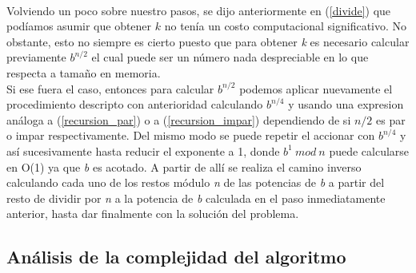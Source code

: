 {\paragraph{}
Volviendo un poco sobre nuestro pasos, se dijo anteriormente en (\ref{divide}) que podíamos asumir que obtener $k$ no tenía un costo computacional significativo. No obstante, esto no siempre es cierto puesto que para obtener \textit{k} es necesario calcular previamente $b^{n/2}$ el cual puede ser un número nada despreciable en lo que respecta a tamaño en memoria.\\
Si ese fuera el caso, entonces para calcular $b^{n/2}$ podemos aplicar nuevamente el procedimiento descripto con anterioridad calculando $b^{n/4}$ y usando una expresion análoga a (\ref{recursion_par}) o a (\ref{recursion_impar}) dependiendo de si $n/2$ es par o impar respectivamente. Del mismo modo se puede repetir el accionar con $b^{n/4}$ y así sucesivamente hasta reducir el exponente a 1, donde $b^1\ mod\ n$ puede calcularse en O(1) ya que \textit{b} es acotado. A partir de allí se realiza el camino inverso calculando cada uno de los restos módulo \textit{n} de las potencias de \textit{b} a partir del resto de dividir por \textit{n} a la potencia de \textit{b} calculada en el paso inmediatamente anterior, hasta dar finalmente con la solución del problema.


\subsection{Análisis de la complejidad del algoritmo}

}
